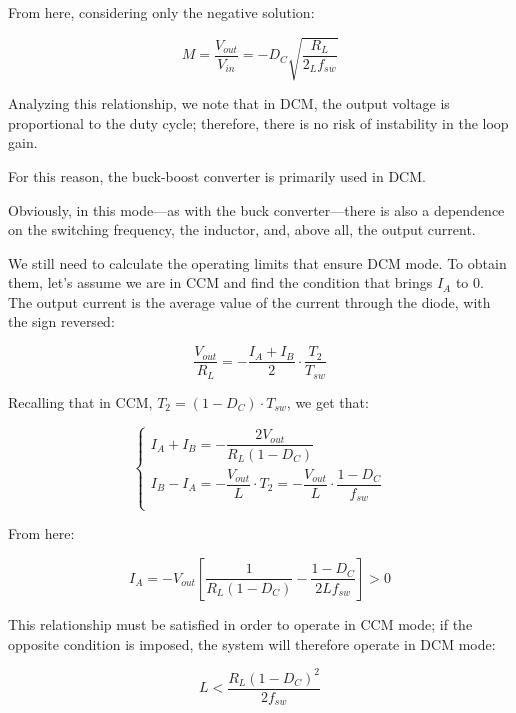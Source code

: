\documentclass[../main.tex]{subfiles}
\begin{document}
From here, considering only the negative solution:

\begin{equation}
	M = \frac{V_{out}}{V_{in}} = -D_C \sqrt{\frac{R_L}{2_Lf_{sw}}}
\end{equation}

Analyzing this relationship, we note that in DCM, the output voltage is proportional to the duty cycle; therefore, there is no risk of instability in the loop gain. 

For this reason, the buck-boost converter is primarily used in DCM.

Obviously, in this mode—as with the buck converter—there is also a dependence on the switching frequency, the inductor, and, above all, the output current.

We still need to calculate the operating limits that ensure DCM mode. To obtain them, let’s assume we are in CCM and find the condition that brings $I_A$ to 0. The output current is the average value of the current through the diode, with the sign reversed:

\begin{equation}
	\frac{V_{out}}{R_L} = - \frac{I_A + I_B}{2} \cdot \frac{T_2}{T_{sw}}
\end{equation}

Recalling that in CCM, $T_2 = (1 - D_C) \cdot T_{sw}$, we get that:

\begin{equation}
\begin{cases}
	I_A + I_B = - \dfrac{2V_{out}}{R_L(1-D_C)} \\
	I_B - I_A = - \dfrac{V_{out}}{L} \cdot T_2 = - \dfrac{V_{out}}{L} \cdot \dfrac{1 - D_C}{f_{sw}}\\
\end{cases}	
\end{equation}

From here:

\begin{equation}
	I_A = -V_{out} \left[ \frac{1}{R_L(1-D_C)} - \frac{1-D_C}{2Lf_{sw}} \right] > 0
\end{equation}


This relationship must be satisfied in order to operate in CCM mode; if the opposite condition is imposed, the system will therefore operate in DCM mode:

\begin{equation}
	L < \frac{R_L(1-D_C)^2}{2f_{sw}}
\end{equation}
\end{document}

